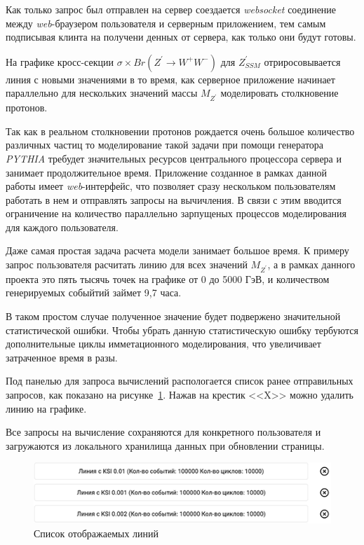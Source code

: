 Как только запрос был отправлен на сервер соездается \textit{websocket} соединение между \textit{web}-браузером пользователя и серверным приложением, тем самым подписывая клинта на получени денных от сервера, как только они будут готовы.

На графике кросс-секции $\sigma \times Br({Z}^{\prime} \rightarrow {W}^{+}{W}^{-})$ для ${Z}^{\prime}_{SSM}$ отриросовывается линия с новыми значениями в то время, как серверное приложение начинает параллельно для нескольких значений массы ${M}_{{Z}^{\prime}}$ моделировать столкновение протонов.

Так как в реальном столкновении протонов рождается очень большое количество различных частиц то моделирование такой задачи при помощи генератора \textit{PYTHIA} требудет значительных ресурсов центрального процессора сервера и занимает продолжительное время. Приложение созданное в рамках данной работы имеет \textit{web}-интерфейс, что позволяет сразу нескольком пользователям работать в нем и отправлять запросы на вычичления. В связи с этим вводится ограничение на количество параллельно зарпущеных процессов моделирования для каждого пользователя.

Даже самая простая задача расчета модели занимает большое время. К примеру запрос пользователя расчитать линию для всех значений ${M}_{{Z}^{\prime}}$, а в рамках данного проекта это пять тысячь точек на графике от 0 до 5000 ГэВ, и количеством генерируемых собыйтий займет 9,7 часа. 

В таком простом случае полученное значение будет подвержено значительной статистической ошибки. Чтобы убрать данную статистическую ошибку тербуются дополнительные циклы имметационного моделирования, что увеличивает затраченное время в разы. 

Под панелью для запроса вычислений распологается список ранее отправильных запросов, как показано на рисунке~\ref{fig:preferences}. Нажав на крестик <<X>> можно удалить линию на графике.

Все запросы на вычисление сохраняются для конкретного пользователя и загружаются из локального хранилища данных при обновлении страницы.

\begin{figure}[!h]
	\centering
	\includegraphics[width=\textwidth]{figures/preferences.png}
	\caption{Список отображаемых линий}
	\label{fig:preferences}
\end{figure}

